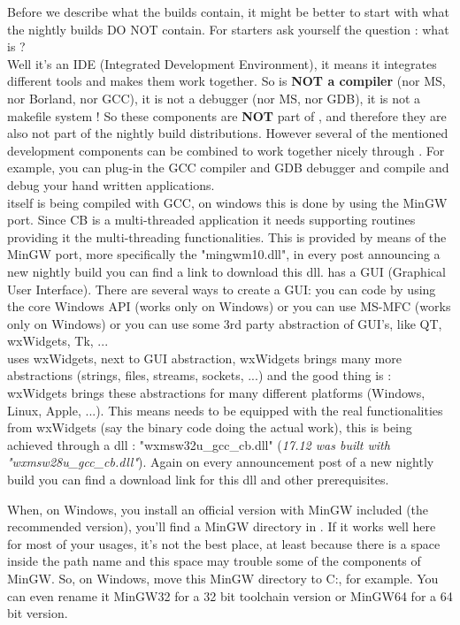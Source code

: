 Before we describe what the builds contain, it might be better to start with what the nightly builds DO NOT contain. For starters ask yourself the question : what is \codeblocks ?\\
Well it's an IDE (Integrated Development Environment), it means it integrates different tools and makes them work together. So \codeblocks is \textbf{NOT a compiler} (nor MS, nor Borland, nor GCC), it is not a debugger (nor MS, nor GDB), it is not a makefile system ! So these components are \textbf{NOT} part of \codeblocks, and therefore they are also not part of the nightly build distributions. However several of the mentioned development components can be combined to work together nicely through \codeblocks. For example, you can plug-in the GCC compiler and GDB debugger and compile and debug your hand written applications.\\
\codeblocks itself is being compiled with GCC, on windows this is done by using the MinGW port. Since CB is a multi-threaded application it needs supporting routines providing it the multi-threading functionalities. This is provided by means of the MinGW port, more specifically the "mingwm10.dll", in every post announcing a new nightly build you can find a link to download this dll.
\codeblocks has a GUI (Graphical User Interface). There are several ways to create a GUI: you can code by using the core Windows API (works only on Windows) or you can use MS-MFC (works only on Windows) or you can use some 3rd party abstraction of GUI's, like QT, wxWidgets, Tk, ...\\
\codeblocks uses wxWidgets, next to GUI abstraction, wxWidgets brings many more abstractions (strings, files, streams, sockets, ...) and the good thing is : wxWidgets brings these abstractions for many different platforms (Windows, Linux, Apple, ...). This means \codeblocks needs to be equipped with the real functionalities from wxWidgets (say the binary code doing the actual work), this is being achieved through a dll : "wxmsw32u\_gcc\_cb.dll" (\textit{17.12 was built with "wxmsw28u\_gcc\_cb.dll"}). Again on every announcement post of a new nightly build you can find a download link for this dll and other prerequisites.

When, on Windows, you install an official version with MinGW included (the recommended version), you'll find a MinGW directory in . If it works well here for most of your usages, it's not the best place, at least because there is a space inside the path name and this space may trouble some of the components of MinGW. So, on Windows, move this MinGW directory to C:, for example. You can even rename it MinGW32 for a 32 bit toolchain version or MinGW64 for a 64 bit version.

